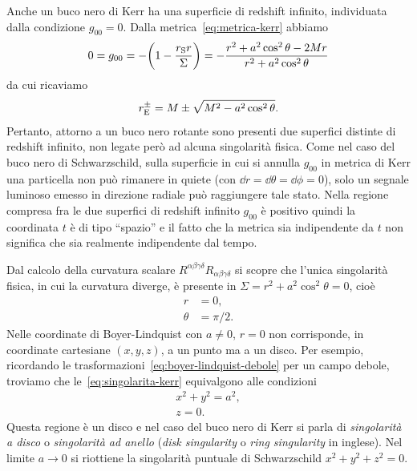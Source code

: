 Anche un buco nero di Kerr ha una superficie di redshift infinito, individuata
dalla condizione \(g_{00} = 0\).  Dalla metrica~\eqref{eq:metrica-kerr} abbiamo
\begin{equation}
  0 = g_{00} = -\biggl(1 - \frac{r_{\textup{S}}r}{\Sigma}\biggr) = -\frac{r^{2}
    + a^{2}\cos^{2}\theta - 2 Mr}{r^{2} + a^{2}\cos^{2}\theta}
\end{equation}
da cui ricaviamo
\begin{equation}
  r_{\textup{E}}^{\pm} = M \pm \sqrt{M^{2} - a^{2}\cos^{2}\theta}.
\end{equation}
Pertanto, attorno a un buco nero rotante sono presenti due superfici distinte di
redshift infinito, non legate però ad alcuna singolarità fisica.  Come nel caso
del buco nero di Schwarzschild, sulla superficie in cui si annulla \(g_{00}\) in
metrica di Kerr una particella non può rimanere in quiete (con \(\dd r =
\dd\theta = \dd\phi = 0\)), solo un segnale luminoso emesso in direzione radiale
può raggiungere tale stato.  Nella regione compresa fra le due superfici di
redshift infinito \(g_{00}\) è positivo quindi la coordinata \(t\) è di tipo
``spazio'' e il fatto che la metrica sia indipendente da \(t\) non significa che
sia realmente indipendente dal tempo.

Dal calcolo della curvatura scalare
\(R^{\alpha\beta\gamma\delta}R_{\alpha\beta\gamma\delta}\) si scopre che l'unica
singolarità fisica, in cui la curvatura diverge, è presente in \(\Sigma = r^{2}
+ a^{2}\cos^{2}\theta = 0\), cioè
\begin{subequations}
  \label{eq:singolarita-kerr}
  \begin{align}
    r &= 0, \\
    \theta &= \pi/2.
  \end{align}
\end{subequations}
Nelle coordinate di Boyer-Lindquist con \(a \neq 0\), \(r = 0\) non corrisponde,
in coordinate cartesiane \((x, y, z)\), a un punto ma a un disco.  Per esempio,
ricordando le trasformazioni~\eqref{eq:boyer-lindquist-debole} per un campo
debole, troviamo che le~\eqref{eq:singolarita-kerr} equivalgono alle condizioni
\begin{subequations}
  \begin{gather}
    x^{2} + y^{2} = a^{2}, \\
    z = 0.
  \end{gather}
\end{subequations}
Questa regione è un disco e nel caso del buco nero di Kerr si parla di
\emph{singolarità a disco} o \emph{singolarità ad anello} (\emph{disk
  singularity} o \emph{ring singularity} in inglese).  Nel limite \(a\to 0\) si
riottiene la singolarità puntuale di Schwarzschild \(x^{2} + y^{2} + z^{2} =
0\).

